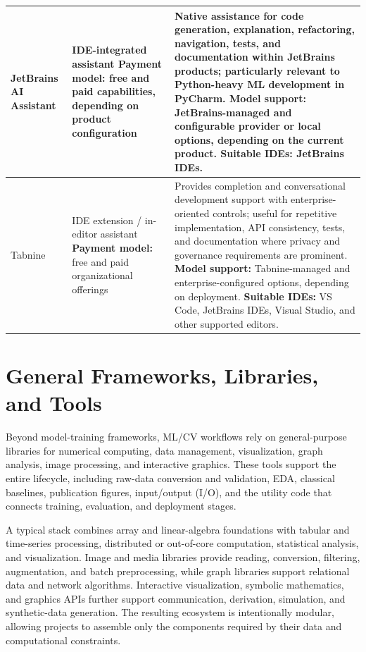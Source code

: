 \documentclass{article}
\newcounter{entry}[section]
\renewcommand{\theentry}{\thesection.\arabic{entry}}
\newcommand{\EntryRow}[5]{
    \noalign{
        \stepcounter{entry}
        \xdef\ENTRYNUM{\theentry}
        \phantomsection\label{entry:#1}
        \addcontentsline{toc}{subsubsection}{\ENTRYNUM\hspace{0.5cm}#2}
    }
    #2 #3 & #4 & #5 \\
    \hline
}
\begin{document}
\begin{longtable}{|p{}|p{}|p{}|}
    \EntryRow{jetbrains_ai_assistant}{JetBrains AI Assistant}{\cite{sokolov2024ai}}{IDE-integrated assistant \newline \textbf{Payment model:} free and paid capabilities, depending on product configuration}{Native assistance for code generation, explanation, refactoring, navigation, tests, and documentation within JetBrains products; particularly relevant to Python-heavy ML development in PyCharm. \newline \textbf{Model support:} JetBrains-managed and configurable provider or local options, depending on the current product. \newline \textbf{Suitable IDEs:} JetBrains IDEs.}

    \EntryRow{tabnine}{Tabnine}{\cite{corso2024generating}}{IDE extension / in-editor assistant \newline \textbf{Payment model:} free and paid organizational offerings}{Provides completion and conversational development support with enterprise-oriented controls; useful for repetitive implementation, API consistency, tests, and documentation where privacy and governance requirements are prominent. \newline \textbf{Model support:} Tabnine-managed and enterprise-configured options, depending on deployment. \newline \textbf{Suitable IDEs:} VS Code, JetBrains IDEs, Visual Studio, and other supported editors.}
\end{longtable}




\clearpage




\section{General Frameworks, Libraries, and Tools}

Beyond model-training frameworks, ML/CV workflows rely on general-purpose libraries for numerical computing, data management, visualization, graph analysis, image processing, and interactive graphics. These tools support the entire lifecycle, including raw-data conversion and validation, EDA, classical baselines, publication figures, input/output (I/O), and the utility code that connects training, evaluation, and deployment stages.

A typical stack combines array and linear-algebra foundations with tabular and time-series processing, distributed or out-of-core computation, statistical analysis, and visualization. Image and media libraries provide reading, conversion, filtering, augmentation, and batch preprocessing, while graph libraries support relational data and network algorithms. Interactive visualization, symbolic mathematics, and graphics APIs further support communication, derivation, simulation, and synthetic-data generation. The resulting ecosystem is intentionally modular, allowing projects to assemble only the components required by their data and computational constraints.
\end{document}
